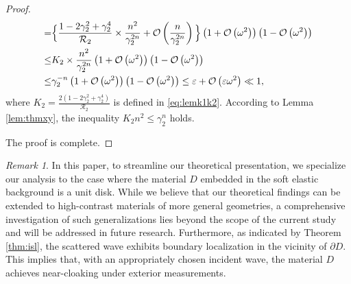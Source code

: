 \documentclass[11pt,reqno,twoside]{amsart}
\theoremstyle{definition}
\theoremstyle{remark}
\newtheorem{rem}{Remark}[section]
\numberwithin{equation}{section}
\begin{document}
\begin{proof}
\begin{align}
		=&\Big\{\frac{1-2\gamma_{2}^2+\gamma_{2}^4}{\mathcal{R}_{2}}\times\frac{n^2}{\gamma_{2}^{2n}}+\mathcal{O}\left(\frac{n}{\gamma_{2}^{2n}}\right)\Big\} \left(1+\mathcal{O}\left(\omega^2\right)\right)\left(1-\mathcal{O}\left(\omega^2\right)\right)\notag\\
		\leq&K_{2}\times\frac{n^2}{\gamma_{2}^{2n}} \left(1+\mathcal{O}\left(\omega^2\right)\right)\left(1-\mathcal{O}\left(\omega^2\right)\right)\notag\\
		\leq&\gamma_2^{-n}\left(1+\mathcal{O}\left(\omega^2\right)\right)\left(1-\mathcal{O}\left(\omega^2\right)\right)\leq\varepsilon+\mathcal{O}\left(\varepsilon\omega^2\right)\ll1,\notag
	\end{align}
	where $K_{2} =\frac{2\left(1-2\gamma_{2}^2+\gamma_{2}^4\right)}{\mathcal{R}_{2}}$ is defined in \eqref{eq:lemk1k2}. According to Lemma \ref{lem:thmxy}, the inequality $K_{2}n^2 \leq \gamma_{2}^{n}$ holds.
	
	The proof is complete.
\end{proof}
\begin{rem}
	In this paper, to streamline our theoretical presentation, we specialize our analysis to the case where the material $D$ embedded in the soft elastic background is a unit disk. While we believe that our theoretical findings can be extended to high-contrast materials of more general geometries, a comprehensive investigation of such generalizations lies beyond the scope of the current study and will be addressed in future research. Furthermore, as indicated by Theorem \ref{thm:isl}, the scattered wave exhibits boundary localization in the vicinity of \(\partial D\). This implies that, with an appropriately chosen incident wave, the material \(D\) achieves near-cloaking under exterior measurements.
\end{rem}
\end{document}
